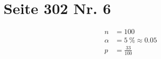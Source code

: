 \documentclass[12pt,a4paper]{report}
\begin{document}
	\section{Seite 302 Nr. 6}
	\begin{align*}
		n &= 100 \\
		\alpha &= 5\ \% \approx 0.05 \\
		p &= \frac{33}{100}
	\end{align*}
\end{document}
